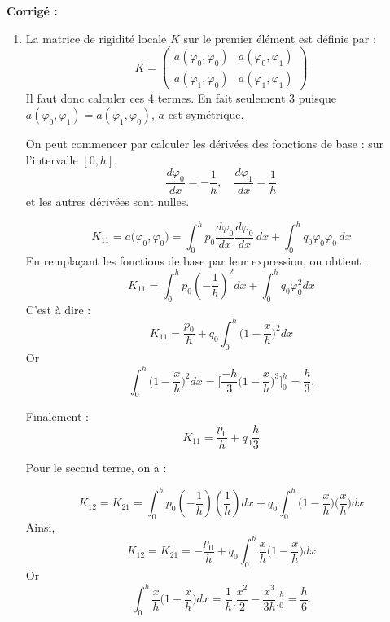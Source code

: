 \documentclass[a4paper,12pt]{article}
\newif\ifcorriges
\newenvironment{solution}
  {
    \ifcorriges
      \begin{framed}
      \par\noindent\textbf{Corrigé :} 
  }
  {
      \end{framed}
    \fi
  }
\begin{document}
\begin{enumerate}
\begin{solution}
        \begin{enumerate}
                \item La matrice de rigidité locale \( K \) sur le premier élément est définie par :
                \[
                K = \left(
                    \begin{array}{cc}
                        a(\varphi_0, \varphi_0) & a(\varphi_0, \varphi_1) \\
                        a(\varphi_1, \varphi_0) & a(\varphi_1, \varphi_1)
                    \end{array}
                \right)
                \]
                Il faut donc calculer ces $4$ termes. En fait seulement $3$ puisque $a(\varphi_0, \varphi_1) = a(\varphi_1, \varphi_0)$, $a$ est symétrique.

                On peut commencer par calculer les dérivées des fonctions de base : sur l'intervalle $[0,h]$,
                \[
                \frac{d\varphi_0}{dx} = -\frac{1}{h}, \quad \frac{d\varphi_1}{dx} = \frac{1}{h}
                \]
                et les autres dérivées sont nulles.

                \[
                K_{11} = a\big(\varphi_0, \varphi_0\big) = \int_{0}^{h} p_0 \frac{d\varphi_0}{dx} \frac{d\varphi_0}{dx} \, dx + \int_{0}^{h} q_0 \varphi_0 \varphi_0 \, dx
                \]
                En remplaçant les fonctions de base par leur expression, on obtient :
                \[
                K_{11} = \int_{0}^{h} p_0 \left( -\frac{1}{h} \right)^2 dx + \int_{0}^{h} q_0 \varphi_0^2 dx
                \]
                C'est à dire :
                \[
                K_{11} = \frac{p_0}{h} + q_0 \int_{0}^{h} \Big(1 - \frac{x}{h}\Big)^2 dx 
                \]  
                Or 
                \[\int_{0}^{h} \Big(1 - \frac{x}{h}\Big)^2 dx = \Big[\frac{-h}{3}\Big(1 - \frac{x}{h}\Big)^3\Big]_{0}^{h} = \frac{h}{3}.\]

                Finalement :
                \[
                K_{11} = \frac{p_0}{h} + q_0 \frac{h}{3}
                \]
                
                Pour le second terme, on a :

                \[
                K_{12} = K_{21} = \int_{0}^{h} p_0 \left( -\frac{1}{h} \right) \left( \frac{1}{h} \right) dx + q_0 \int_{0}^{h} \Big(1 - \frac{x}{h}\Big) \Big(\frac{x}{h}\Big) dx
                \]
                Ainsi, 
                \[
                K_{12} = K_{21} = -\frac{p_0}{h} + q_0 \int_{0}^{h} \frac{x}{h} \Big(1 - \frac{x}{h}\Big)  dx
                \]
                Or 
                \[\int_{0}^{h} \frac{x}{h}\Big(1 - \frac{x}{h}\Big)  dx = \frac{1}{h}\Big[\frac{x^2}{2} - \frac{x^3}{3h}\Big]_{0}^{h} = \frac{h}{6}.\]


\end{enumerate}
\end{solution}
\end{enumerate}
\end{document}
